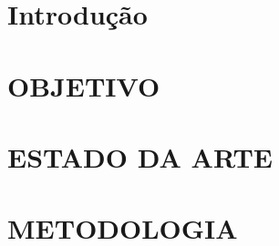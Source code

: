 \documentclass[
  a4paper,
  12pt,
  english,
  brazilian,
]{article}
\begin{document}
\section*{Introdução}%
\label{sect:intro}


\section*{OBJETIVO}\label{sect:obj}



\section*{ESTADO DA ARTE}\label{sect:estadoarte}



\section*{METODOLOGIA}\label{sect:metodologia}



\newpage

\printbibliography
\end{document}
